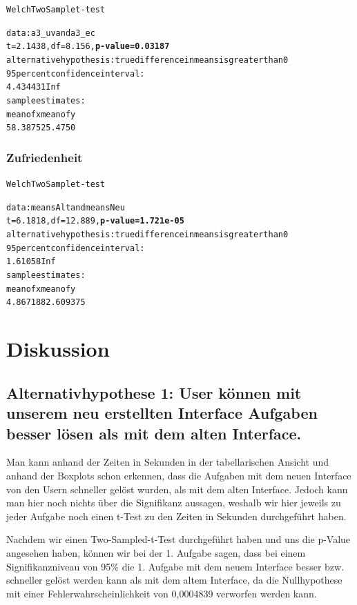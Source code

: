 \documentclass[a4paper,10pt]{scrartcl}
\begin{document}
\begin{alltt}
Welch Two Sample t-test

data:  a3_uv and a3_ec 
t = 2.1438, df = 8.156, \textbf{p-value = 0.03187}
alternative hypothesis: true difference in means is greater than 0 
95 percent confidence interval:
 4.434431      Inf 
sample estimates:
mean of x mean of y 
  58.3875   25.4750 
\end{alltt} 

\subsubsection*{Zufriedenheit} 

\begin{alltt}
Welch Two Sample t-test

data:  meansAlt and meansNeu 
t = 6.1818, df = 12.889, \textbf{p-value = 1.721e-05}
alternative hypothesis: true difference in means is greater than 0 
95 percent confidence interval:
 1.61058     Inf 
sample estimates:
mean of x mean of y 
 4.867188  2.609375 
\end{alltt} 

\section{Diskussion}

\subsection{Alternativhypothese 1:  User können mit unserem neu erstellten Interface Aufgaben besser lösen als mit dem alten Interface.}

Man kann anhand der Zeiten in Sekunden in der tabellarischen Ansicht und anhand der Boxplots schon erkennen, dass die Aufgaben
mit dem neuen Interface von den Usern schneller gelöst wurden, als mit dem alten Interface. Jedoch kann
man hier noch nichts über die Signifikanz aussagen, weshalb wir hier jeweils zu jeder Aufgabe noch einen t-Test zu den
Zeiten in Sekunden durchgeführt haben.

\medskip

Nachdem wir einen Two-Sampled-t-Test durchgeführt haben und uns die p-Value angesehen haben, können wir bei
der 1. Aufgabe sagen, dass bei einem Signifikanzniveau von 95\% die 1. Aufgabe mit dem neuem Interface besser bzw. schneller gelöst werden kann als mit dem altem Interface, da die Nullhypothese mit einer Fehlerwahrscheinlichkeit von 0,0004839 verworfen werden kann.
\end{document}
